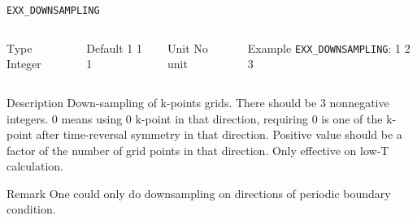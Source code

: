     
    \begin{frame}[allowframebreaks]{\texttt{EXX\_DOWNSAMPLING}} \label{EXX_DOWNSAMPLING}
    \vspace*{-12pt}
    \begin{columns}
    \begin{block}{Type}
    Integer
    \end{block}
    
    \begin{block}{Default}
    1 1 1
    \end{block}
    
    \begin{block}{Unit}
    No unit
    \end{block}
    
    \begin{block}{Example}
    \texttt{EXX\_DOWNSAMPLING}: 1 2 3
    \end{block}
    \end{columns}
    
    \begin{block}{Description}
    Down-sampling of k-points grids. There should be 3 nonnegative integers. 0 means using 0 k-point in that direction, 
    requiring 0 is one of the k-point after time-reversal symmetry in that direction. 
    Positive value should be a factor of the number of grid points in that direction. Only effective on low-T calculation.
    \end{block}
    
    \begin{block}{Remark}
    One could only do downsampling on directions of periodic boundary condition.
    \end{block}
    
    \end{frame}
    
